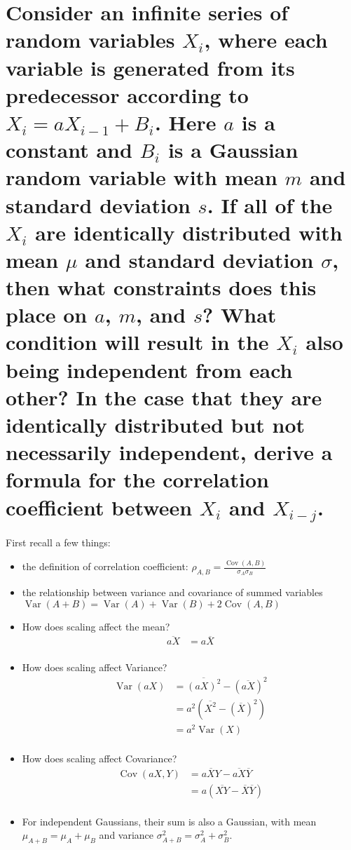 \section{Consider an infinite series of random variables
\texorpdfstring{$X_i$}{Xi}, where each variable is generated from its
predecessor according to
\texorpdfstring{$X_i = aX_{i-1} + B_i$}{Xi = aXi-1 + Bi}.
Here \texorpdfstring{$a$}{a} is a constant and \texorpdfstring{$B_i$}{Bi}
is a Gaussian random variable with mean \texorpdfstring{$m$}{m}
and standard deviation \texorpdfstring{$s$}{s}.
If all of the \texorpdfstring{$X_i$}{Xi} are identically distributed
with mean \texorpdfstring{$\mu$}{mu} and standard deviation
\texorpdfstring{$\sigma$}{sigma}, then what constraints does this place on
\texorpdfstring{$a$}{a}, \texorpdfstring{$m$}{m}, and \texorpdfstring{$s$}{s}?
What condition will result in the \texorpdfstring{$X_i$}{Xi} also being
independent from each other? In the case that they are identically
distributed but not necessarily independent,
derive a formula for the correlation coefficient between
\texorpdfstring{$X_i$}{Xi} and \texorpdfstring{$X_{i-j}$}{Xi-j}.}

First recall a few things:
\begin{itemize}
    \item the definition of correlation coefficient: $\rho_{A,B} = \frac{\operatorname{Cov}(A,B)}{\sigma_A \sigma_B}$
    \item the relationship between variance and covariance of summed variables $\operatorname{Var}(A+B) = \operatorname{Var}(A) + \operatorname{Var}(B) + 2\operatorname{Cov}(A, B)$
    \item How does scaling affect the mean?
    \begin{align*}
        \overline{aX} &= a\overline{X} \\
    \end{align*}
    \item How does scaling affect Variance?
    \begin{align*}
        \operatorname{Var}(aX) &= \overline{(aX)^2} - (\overline{aX})^2 \\
        &= a^2\left(\overline{X^2} - (\overline{X})^2\right) \\
        &= a^2\operatorname{Var}(X) \\
    \end{align*}
    \item How does scaling affect Covariance?
    \begin{align*}
        \operatorname{Cov}(aX, Y) &= \overline{aXY} - \overline{aX}\overline{Y} \\
        &= a(\overline{XY} - \overline{X}\overline{Y}) \\
    \end{align*}
    \item For independent Gaussians, their sum is also a Gaussian, with mean $\mu_{A + B} = \mu_A + \mu_B$ and variance $\sigma_{A+B}^2 =\sigma_A^2 + \sigma_B^2$. 
\end{itemize}


